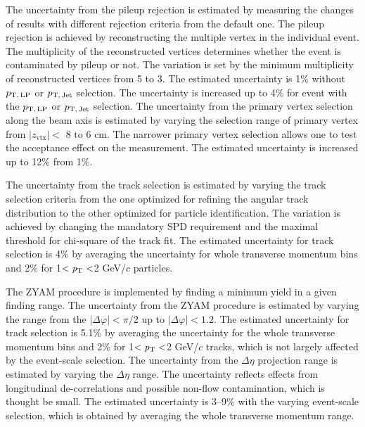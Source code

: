 The uncertainty from the pileup rejection is estimated by measuring the changes of results with different rejection criteria from the default one. The pileup rejection is achieved by reconstructing the multiple vertex in the individual event. The multiplicity of the reconstructed vertices determines whether the event is contaminated by pileup or not. The variation is set by the minimum multiplicity of reconstructed vertices from 5 to 3. 
The estimated uncertainty is 1\% without $p_\mathrm{T,\,LP}$ or $p_\mathrm{T,\,Jet}$ selection. The uncertainty is increased up to 4\% for event with the $p_\mathrm{T,\,LP}$ or $p_\mathrm{T,\,Jet}$ selection. The uncertainty from the primary vertex selection along the beam axis is estimated by varying the selection range of primary vertex from $|z_\mathrm{vtx}|<$ 8 to 6 cm. The narrower primary vertex selection allows one to test the acceptance effect on the measurement. The estimated uncertainty is increased up to 12\% from 1\%.

The uncertainty from the track selection is estimated by varying the track selection criteria from the one optimized for refining the angular track distribution to the other optimized for particle identification. The variation is achieved by changing the mandatory SPD requirement and the maximal threshold for chi-square of the track fit.
The estimated uncertainty for track selection is 4\% by averaging the uncertainty for whole transverse momentum bins and 2\% for 1$<\it{p}_{\rm{T}}<$2 GeV/$c$ particles.

The ZYAM procedure is implemented by finding a minimum yield in a given finding range. The uncertainty from the ZYAM procedure is estimated by varying the range from the $|\Delta\varphi|<\pi/$2 up to $|\Delta\varphi|<1.2$. The estimated uncertainty for track selection is 5.1\% by averaging the uncertainty for the whole transverse momentum bins and 2\% for 1$<\it{p}_{\rm{T}}<$2 GeV/$c$ tracks, which is not largely affected by the event-scale selection. The uncertainty from the $\Delta\eta$ projection range is estimated by varying the $\Delta\eta$ range. The uncertainty reflects effects from longitudinal de-correlations and possible non-flow contamination, which is thought be small. The estimated uncertainty is 3--9\% with the varying event-scale selection, which is obtained by averaging the whole transverse momentum range.

